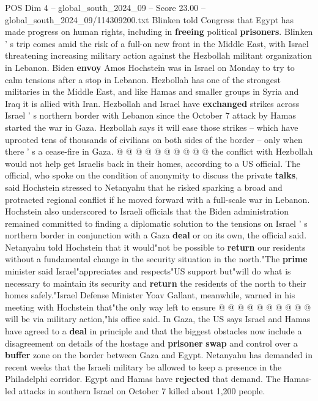 \begin{textsample}{POS Dim 4 – global\_south\_2024\_09 – Score 23.00 – global\_south\_2024\_09/114309200.txt}
Blinken told Congress that Egypt has made progress on human rights, including in \textbf{freeing} political \textbf{prisoners}.
Blinken ' s trip comes amid the risk of a full-on new front in the Middle East, with Israel threatening increasing military action against the Hezbollah militant organization in Lebanon.
Biden \textbf{envoy} Amos Hochstein was in Israel on Monday to try to calm tensions after a stop in Lebanon.
Hezbollah has one of the strongest militaries in the Middle East, and like Hamas and smaller groups in Syria and Iraq it is allied with Iran.
Hezbollah and Israel have \textbf{exchanged} strikes across Israel ' s northern border with Lebanon since the October 7 attack by Hamas started the war in Gaza.
Hezbollah says it will ease those strikes -- which have uprooted tens of thousands of civilians on both sides of the border -- only when there ' s a cease-fire in Gaza. @ @ @ @ @ @ @ @ @ @ the conflict with Hezbollah would not help get Israelis back in their homes, according to a US official.
The official, who spoke on the condition of anonymity to discuss the private \textbf{talks}, said Hochstein stressed to Netanyahu that he risked sparking a broad and protracted regional conflict if he moved forward with a full-scale war in Lebanon.
Hochstein also underscored to Israeli officials that the Biden administration remained committed to finding a diplomatic solution to the tensions on Israel ' s northern border in conjunction with a Gaza \textbf{deal} or on its own, the official said.
Netanyahu told Hochstein that it would"not be possible to \textbf{return} our residents without a fundamental change in the security situation in the north."The \textbf{prime} minister said Israel"appreciates and respects"US support but"will do what is necessary to maintain its security and \textbf{return} the residents of the north to their homes safely."Israel Defense Minister Yoav Gallant, meanwhile, warned in his meeting with Hochstein that"the only way left to ensure @ @ @ @ @ @ @ @ @ @ will be via military action,"his office said.
In Gaza, the US says Israel and Hamas have agreed to a \textbf{deal} in principle and that the biggest obstacles now include a disagreement on details of the hostage and \textbf{prisoner} \textbf{swap} and control over a \textbf{buffer} zone on the border between Gaza and Egypt.
Netanyahu has demanded in recent weeks that the Israeli military be allowed to keep a presence in the Philadelphi corridor.
Egypt and Hamas have \textbf{rejected} that demand.
The Hamas-led attacks in southern Israel on October 7 killed about 1,200 people.

\end{textsample}
